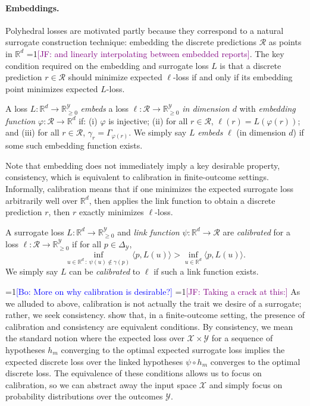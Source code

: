 \documentclass[anon]{colt2020} %
\newcommand{\Comments}{1}
\newcommand{\mynote}[2]{\ifnum\Comments=1\textcolor{#1}{#2}\fi}
\newcommand{\jessie}[1]{\mynote{purple}{[JF: #1]}}
\newcommand{\bo}[1]{\mynote{blue}{[Bo: #1]}}
\newcommand{\reals}{\mathbb{R}}
\newcommand{\nonnegreals}{\reals_{\geq 0}}%
\newcommand{\simplex}{\Delta_\Y}
\newcommand{\R}{\mathcal{R}}
\newcommand{\X}{\mathcal{X}}
\newcommand{\Y}{\mathcal{Y}}
\newcommand{\inprod}[2]{\langle #1, #2 \rangle}%
\begin{document}
\paragraph{Embeddings.}
Polyhedral losses are motivated partly because they correspond to a natural surrogate construction technique: embedding the discrete predictions $\R$ as points in $\reals^d$ \jessie{and linearly interpolating between embedded reports}.
The key condition required on the embedding and surrogate loss $L$ is that a discrete prediction $r \in \R$ should minimize expected $\ell$-loss if and only if its embedding point minimizes expected $L$-loss.
%
\begin{definition}
  A loss $L: \reals^d \to \nonnegreals^{\Y}$ \emph{embeds} a loss $\ell: \R \to \nonnegreals^{\Y}$ \emph{in dimension $d$} with \emph{embedding function $\varphi: \R \to \reals^d$} if: (i) $\varphi$ is injective; (ii) for all $r \in \R$, $\ell(r) = L(\varphi(r))$; and (iii) for all $r \in \R$, $\gamma_r = \Gamma_{\varphi(r)}$.
  We simply say $L$ \emph{embeds} $\ell$ (in dimension $d$) if some such embedding function exists.
\end{definition}
%
Note that embedding does not immediately imply a key desirable property, consistency, which is equivalent to calibration in finite-outcome settings.
Informally, calibration means that if one minimizes the expected surrogate loss arbitrarily well over $\reals^d$, then applies the link function to obtain a discrete prediction $r$, then $r$ exactly minimizes $\ell$-loss.
\begin{definition}\label{def:calibration}
  A surrogate loss $L: \reals^d \to \nonnegreals^{\Y}$ and \emph{link function} $\psi: \reals^d \to \R$ are \emph{calibrated} for a loss $\ell: \R \to \nonnegreals^{\Y}$ if for all $p \in \simplex$,
    \[ \inf_{u \in \reals^d ~:~ \psi(u) \not\in \gamma(p)} \inprod{p}{L(u)}  > \inf_{u \in \reals^d} \inprod{p}{L(u)}  .\]
  We simply say $L$ can be \emph{calibrated} to $\ell$ if such a link function exists.
\end{definition}
\bo{More on why calibration is desirable?}
\jessie{Taking a crack at this:}
As we alluded to above, calibration is not actually the trait we desire of a surrogate; rather, we seek consistency.
\cite{tewari2007consistency} show that, in a finite-outcome setting, the presence of calibration and consistency are equivalent conditions.
By consistency, we mean the standard notion where the expected loss over $\X \times \Y$ for a sequence of hypotheses $h_m$ converging to the optimal expected surrogate loss implies the expected discrete loss over the linked hypotheses $\psi \circ h_m$ converges to the optimal discrete loss.
The equivalence of these conditions allows us to focus on calibration, so we can abstract away the input space $\X$ and simply focus on probability distributions over the outcomes $\Y$.
\end{document}
